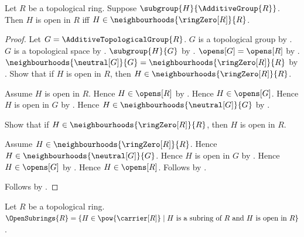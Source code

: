 \begin{theorem}\label{additive_subgroup_open_iff_neighbourhood_of_zero}
    Let $R$ be a topological ring.
    Suppose $\subgroup{H}{\AdditiveGroup{R}}$.
    Then $H$ is open in $R$ iff
        $H\in\neighbourhoods{\ringZero[R]}{R}$.
\end{theorem}
\begin{proof}
    Let $G=\AdditiveTopologicalGroup{R}$.
    $G$ is a topological group by
        .
    $G$ is a topological space by
        .
    $\subgroup{H}{G}$ by
        .
    $\opens[G]=\opens[R]$ by
        .
    $\neighbourhoods{\neutral[G]}{G}
        =\neighbourhoods{\ringZero[R]}{R}$ by
        .
    Show that if $H$ is open in $R$, then
        $H\in\neighbourhoods{\ringZero[R]}{R}$.
    \begin{subproof}
        Assume $H$ is open in $R$.
        Hence $H\in\opens[R]$ by .
        Hence $H\in\opens[G]$.
        Hence $H$ is open in $G$ by .
        Hence $H\in\neighbourhoods{\neutral[G]}{G}$ by
            .
    \end{subproof}
    Show that if $H\in\neighbourhoods{\ringZero[R]}{R}$, then
        $H$ is open in $R$.
    \begin{subproof}
        Assume $H\in\neighbourhoods{\ringZero[R]}{R}$.
        Hence $H\in\neighbourhoods{\neutral[G]}{G}$.
        Hence $H$ is open in $G$ by
            .
        Hence $H\in\opens[G]$ by .
        Hence $H\in\opens[R]$.
        Follows by .
    \end{subproof}
    Follows by \auto.
\end{proof}

\begin{definition}\label{open_subrings}
    Let $R$ be a topological ring.
    $\OpenSubrings{R}=\{H\in\pow{\carrier[R]}\mid
        \text{$H$ is a subring of $R$ and $H$ is open in $R$}\}$.
\end{definition}

